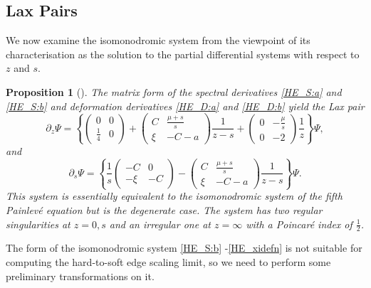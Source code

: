 \documentclass[10pt,reqno]{amsart}
\theoremstyle{plain}
\newtheorem{proposition}{Proposition}
\theoremstyle{definition}
\theoremstyle{remark}
\begin{document}
\subsection{Lax Pairs}\label{SS:HE_LaxPairs}

We now examine the isomonodromic system from the viewpoint of its characterisation as the solution to the 
partial differential systems with respect to $ z $ and $ s $.  
\begin{proposition}[{\cite[Eqs. (5.51,5.52,5.54-7)]{FW_2007}}]
The matrix form of the spectral derivatives \eqref{HE_S:a} and \eqref{HE_S:b} and deformation 
derivatives \eqref{HE_D:a} and \eqref{HE_D:b} yield the Lax pair
\begin{equation}
  \partial_z \Psi = 
  \left\{  \begin{pmatrix} 0 & 0 \\ \frac{1}{4} & 0 \end{pmatrix} 
          +\begin{pmatrix} C & \frac{\displaystyle\mu+s}{\displaystyle s} \\ \xi & -C-a \end{pmatrix}\frac{1}{z-s}
          +\begin{pmatrix} 0 & -\frac{\displaystyle\mu}{\displaystyle s} \\ 0 & -2 \end{pmatrix}\frac{1}{z}
  \right\} \Psi ,
\label{HE_LP:a}
\end{equation}
and
\begin{equation}
  \partial_s \Psi = 
  \left\{  \frac{1}{s}\begin{pmatrix} -C & 0 \\ -\xi & -C \end{pmatrix}
          -\begin{pmatrix} C & \frac{\displaystyle\mu+s}{\displaystyle s} \\ \xi & -C-a \end{pmatrix}\frac{1}{z-s}
  \right\} \Psi .
\label{HE_LP:b}
\end{equation}
This system is essentially equivalent to the isomonodromic system
of the fifth Painlev\'e equation but is the degenerate case.
The system has two regular singularities at $ z=0,s $ and an irregular one at $ z=\infty $
with a Poincar\'e index of $ \tfrac{1}{2} $.
\end{proposition}
 
The form of the isomonodromic system \eqref{HE_S:b} -\eqref{HE_xidefn} is not suitable for computing the
hard-to-soft edge scaling limit, so we need to perform some preliminary transformations on it.
\end{document}
